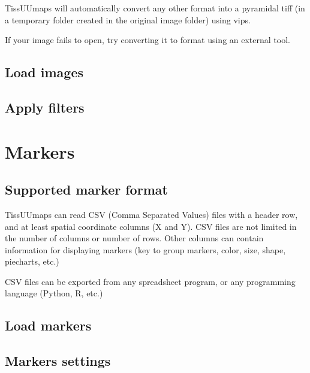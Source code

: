 \documentclass[letterpaper,10pt,english,openany,oneside]{sphinxmanual}
\begin{document}
\sphinxAtStartPar
TissUUmaps will automatically convert any other format into a pyramidal tiff (in a temporary  folder created in the original image folder) using vips.

\sphinxAtStartPar
If your image fails to open, try converting it to  format using an external tool.


\subsection{Load images}
\label{\detokenize{docs/starting/images:load-images}}



\subsection{Apply filters}
\label{\detokenize{docs/starting/images:apply-filters}}
\sphinxstepscope


\section{Markers}
\label{\detokenize{docs/starting/markers:markers}}\label{\detokenize{docs/starting/markers::doc}}

\subsection{Supported marker format}
\label{\detokenize{docs/starting/markers:supported-marker-format}}
\sphinxAtStartPar
TissUUmaps can read CSV (Comma Separated Values) files with a header row, and at least spatial coordinate columns (X and Y). CSV files are not limited in the number of columns or number of rows. Other columns can contain information for displaying markers (key to group markers, color, size, shape, piecharts, etc.)

\sphinxAtStartPar
CSV files can be exported from any spreadsheet program, or any programming language (Python, R, etc.)


\subsection{Load markers}
\label{\detokenize{docs/starting/markers:load-markers}}

\subsection{Markers settings}
\label{\detokenize{docs/starting/markers:markers-settings}}
\end{document}

